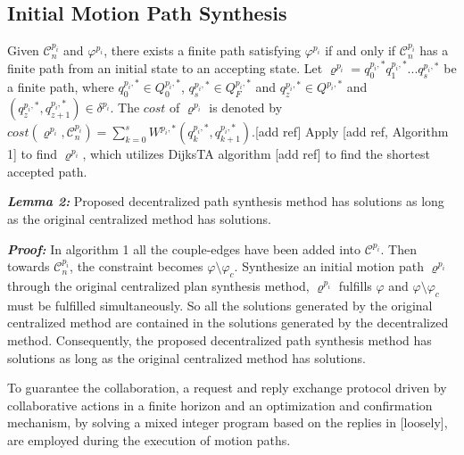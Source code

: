 \documentclass[journal]{IEEEtran}
\begin{document}
\subsection{Initial Motion Path Synthesis}
Given $\mathcal{C}^{p_i}_n$ and $\varphi^{p_i}$, there exists a finite path satisfying $\varphi^{p_i}$ if and only if $\mathcal{C}^{p_i}_n$ has a finite path from an initial state to an accepting state. Let $\varrho^{p_i}=q^{p_i,\ast}_0 q^{p_i,\ast}_1 ... q^{p_i,\ast}_s$ be a finite path, where $q^{p_i,\ast}_0\in Q^{p_i,\ast}_0$, $q^{p_i,\ast}_s\in Q^{p_i,\ast}_F$ and $q^{p_i,\ast}_z\in Q^{p_i,\ast}$ and $(q^{p_i,\ast}_z,q^{p_i,\ast}_{z+1})\in \delta^{p_i}$. The $cost$ of $\varrho^{p_i}$ is denoted by $cost(\varrho^{p_i},\mathcal{C}^{p_i}_n)=\sum^{s}_{k=0}W^{p_i,\ast}(q^{p_i,\ast}_k,q^{p_i,\ast}_{k+1})$.[add ref] Apply [add ref, Algorithm 1] to find $\varrho^{p_i}$, which utilizes DijksTA algorithm [add ref] to find the shortest accepted path.

\textbf{\emph{Lemma 2:}} Proposed decentralized path synthesis method has solutions as long as the original centralized method has solutions.\par
\textbf{\emph{Proof:}} In algorithm 1 all the couple-edges have been added into $\mathcal{C}^{p_i}$. Then towards $\mathcal{C}^{p_i}_n$, the constraint becomes $\varphi \setminus \varphi_c$. Synthesize an initial motion path $\varrho^{p_i}$ through the original centralized plan synthesis method, $\varrho^{p_i}$ fulfills $\varphi$ and $\varphi \setminus \varphi_c$ must be fulfilled simultaneously. So all the solutions generated by the original centralized method are contained in the solutions generated by the decentralized method. Consequently, the proposed decentralized path synthesis method has solutions as long as the original centralized method has solutions.\par

To guarantee the collaboration, a request and reply exchange protocol driven by
collaborative actions in a finite horizon and an optimization and
confirmation mechanism, by solving a mixed integer program
based on the replies in [loosely], are employed during the execution of motion paths.
%
\end{document}
